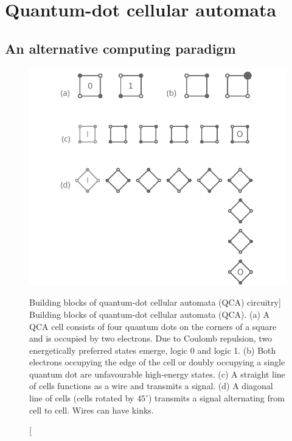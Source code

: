 \chapter{Quantum-dot cellular automata}
\label{ch:QCA_intro}
\graphicspath{{../gfx/chapter01/}}



\section{An alternative computing paradigm}
\label{sec:an_alternative_computing_paradigm}

\begin{figure}
  \center
  \includegraphics{intro_qca}
  \caption
[Building blocks of quantum-dot cellular automata (QCA) circuitry]
{
Building blocks of quantum-dot cellular automata (QCA). (a) A QCA cell consists
of four quantum dots on the corners of a square and is occupied by two
electrons. Due to Coulomb repulsion, two energetically preferred states emerge,
logic 0 and logic 1. (b) Both electrons occupying the edge of the cell or
doubly occupying a single quantum dot are unfavourable high-energy states. (c) A
straight line of cells functions as a wire and transmits a signal. (d) A
diagonal line of cells (cells rotated by $45^{\circ}$) transmits a signal
alternating from cell to cell. Wires can have kinks.
}
  \label{fig:intro_qca}
\end{figure}
